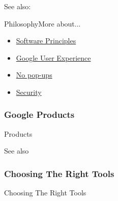 See also: 

\begin{frame}{\googlelogo{} Philosophy}{More about...}
  \begin{itemize}
  \item \href{http://www.google.com/corporate/software_principles.html}{Software Principles}
  \item \href{http://www.google.com/corporate/ux.html}{Google User Experience}
  \item \href{http://www.google.com/corporate/nopopupads.html}{No pop-ups}
  \item \href{http://www.google.com/corporate/security.html}{Security}
  \end{itemize}
\end{frame}

\subsubsection{Google Products}

\begin{frame}{\googlelogo{} Products}
  \centering
  \mode<beamer>{ \texttt{[image: Google-Icons]} }%
\end{frame}

See also 

\subsubsection[Browsers]{Choosing The Right Tools}

\begin{frame}{Choosing The Right Tools}
\end{frame}

